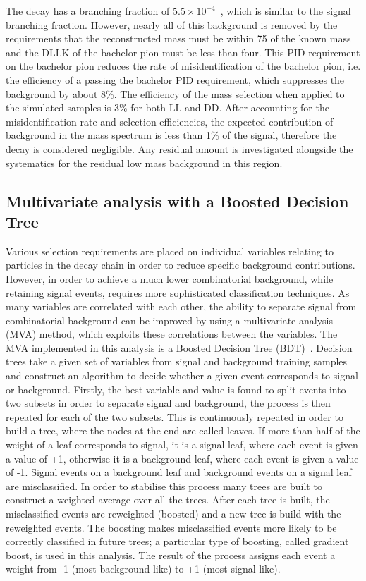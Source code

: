 The decay \decay{\Bm}{\D\KS\Km} has a branching fraction of $5.5 \times 10^{-4}$~\cite{PDG2014}, which is similar to the signal \decay{\Bm}{\D\Kstarm(\KS\pim)} branching fraction. However, nearly all of this background is removed by the requirements that the reconstructed \Kstarm mass must be within 75 \mevcc of the known \Kstar mass and the DLLK of the bachelor pion must be less than four. This PID requirement on the bachelor pion reduces the rate of misidentification of the bachelor pion, i.e. the efficiency of a \Km passing the bachelor PID requirement, which suppresses the background by about 8\%. The efficiency of the \Kstarm mass selection when applied to the simulated \decay{\Bm}{\D\KS\Km} samples is 3\% for both LL and DD. After accounting for the misidentification rate and selection efficiencies, the expected contribution of \decay{\Bm}{\D\KS\Km} background in the \kpi mass spectrum is less than 1\% of the signal, therefore the decay is considered negligible. Any residual amount is investigated alongside the systematics for the residual low mass background in this region.

\subsection{Multivariate analysis with a Boosted Decision Tree}
\label{sec:selection:bdt}

Various selection requirements are placed on individual variables relating to particles in the decay chain in order to reduce specific background contributions. However, in order to achieve a much lower combinatorial background, while retaining signal events, requires more sophisticated classification techniques. As many variables are correlated with each other, the ability to separate signal from combinatorial background can be improved by using a multivariate analysis (MVA) method, which exploits these correlations between the variables. The MVA implemented in this analysis is a Boosted Decision Tree (BDT)~\cite{Breiman}. Decision trees take a given set of variables from signal and background training samples and construct an algorithm to decide whether a given event corresponds to signal or background. Firstly, the best variable and value is found to split events into two subsets in order to separate signal and background, the process is then repeated for each of the two subsets. This is continuously repeated in order to build a tree, where the nodes at the end are called leaves. If more than half of the weight of a leaf corresponds to signal, it is a signal leaf, where each event is given a value of +1, otherwise it is a background leaf, where each event is given a value of -1. Signal events on a background leaf and background events on a signal leaf are misclassified. In order to stabilise this process many trees are built to construct a weighted average over all the trees. After each tree is built, the misclassified events are reweighted (boosted) and a new tree is build with the reweighted events. The boosting makes misclassified events more likely to be correctly classified in future trees; a particular type of boosting, called gradient boost, is used in this analysis. The result of the process assigns each event a weight from -1 (most background-like) to +1 (most signal-like). 

